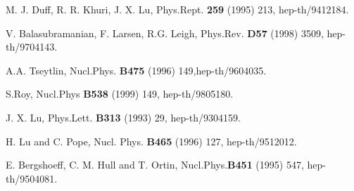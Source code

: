 \documentclass[a4paper,12pt,fleqn,cite,epsfig]{article}
\begin{document}
\begin{thebibliography}{99}
  M. J. Duff, R. R. Khuri, J. X. Lu,
Phys.Rept. {\bf 259} (1995) 213, hep-th/9412184.

 V. Balasubramanian, F. Larsen, R.G. Leigh,
Phys.Rev. {\bf D57} (1998) 3509, hep-th/9704143.
 
 A.A. Tseytlin, Nucl.Phys. {\bf B475} (1996)
  149,hep-th/9604035.
 
 S.Roy, Nucl.Phys {\bf B538} (1999) 149,
 hep-th/9805180.

 J. X. Lu, Phys.Lett. {\bf B313} (1993) 29,
  hep-th/9304159.

 H. Lu and C. Pope, Nucl. Phys. {\bf B465} (1996) 127,
hep-th/9512012.

 E. Bergshoeff, C. M. Hull and T. Ortin, Nucl.Phys.{\bf B451}
(1995) 547, hep-th/9504081.


\end{thebibliography}
\end{document}
